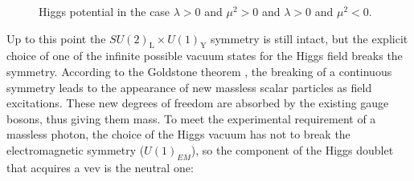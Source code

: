 \begin{figure}[ht]
\centering
{}
\caption{Higgs potential in the case  $\lambda > 0$ and  $\mu^2 > 0$ and $\lambda > 0$ and $\mu^2 < 0$.}
\label{fig:sm:HiggsV}
\end{figure}

Up to this point the $SU(2)_\mathrm{L} \times U(1)_\mathrm{Y}$ symmetry is still intact, but the explicit choice of one of the infinite possible vacuum states for the Higgs field breaks the symmetry. According to the Goldstone theorem \cite{Goldstone:1962es}, the breaking of a continuous symmetry leads to the appearance of new massless scalar particles as field excitations. These new degrees of freedom are absorbed by the existing gauge bosons, thus giving them mass. To meet the experimental requirement of a massless photon, the choice of the Higgs vacuum has not to break the electromagnetic symmetry ($U(1)_{EM}$), so the component of the Higgs doublet that acquires a \gls{vev} is the neutral one:

